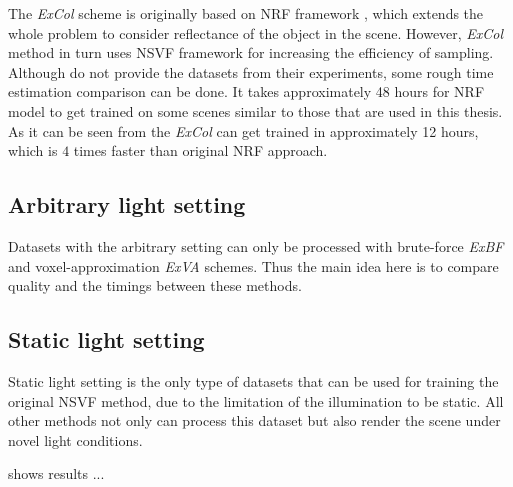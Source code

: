 The \textit{ExCol} scheme is originally based on NRF framework \cite{bi2020neural},
which extends the whole problem to consider reflectance of the object in the scene.
However, \textit{ExCol} method in turn uses NSVF framework for increasing the efficiency of sampling.
Although \cite{bi2020neural} do not provide the datasets from their experiments,
some rough time estimation comparison can be done.
It takes approximately 48 hours for NRF model to get trained on some scenes
similar to those that are used in this thesis.
As it can be seen from 
the \textit{ExCol} can get trained in approximately 12 hours,
which is $4$ times faster than original NRF approach.




\subsection{Arbitrary light setting}

Datasets with the arbitrary setting can only be processed with brute-force \textit{ExBF} and voxel-approximation \textit{ExVA} schemes.
Thus the main idea here is to compare quality and the timings between these methods.








\subsection{Static light setting}

Static light setting is the only type of datasets that can be used
for training the original NSVF method,
due to the limitation of the illumination to be static.
All other methods not only can process this dataset but also render the scene under novel light conditions.

 shows results ...


